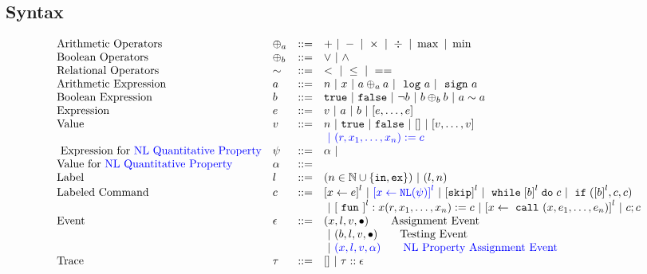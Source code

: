 %
%
\subsection{Syntax}
\[
\begin{array}{llll}
\mbox{Arithmetic Operators} 
& \oplus_a & ::= & + ~|~ - ~|~ \times 
%
~|~ \div ~|~ \max ~|~ \min\\  
\mbox{Boolean Operators} 
& \oplus_b & ::= & \lor ~|~ \land
\\
%
\mbox{Relational Operators} 
& \sim & ::= & < ~|~ \leq ~|~ == 
\\  
%
\mbox{Arithmetic Expression} 
& \aexpr & ::= & 
n ~|~ {x} ~|~ \aexpr \oplus_a \aexpr  
 ~|~ \elog \aexpr  ~|~ \esign \aexpr
\\
%
\mbox{Boolean Expression} & \bexpr & ::= & 
%
\etrue ~|~ \efalse  ~|~ \neg \bexpr
 ~|~ \bexpr \oplus_b \bexpr
%
~|~ \aexpr \sim \aexpr 
\\
%
\mbox{Expression} & \expr & ::= & v ~|~ \aexpr ~|~ \bexpr ~|~ [\expr, \dots, \expr]
\\  
%
\mbox{Value} 
& v & ::= & { n ~|~ \etrue ~|~ \efalse ~|~ [] ~|~ [v, \dots, v]}  
\\ 
&&&
\highlight
{
~|~ (r, x_1, \ldots, x_n) := c
}
\\
%
\mbox{ Expression for \highlight{NL Quantitative Property}} 
& {\qexpr} & ::= 
& 
{ \qval ~|~ 
} 
\\
%
\mbox{Value for \highlight{NL Quantitative Property}} & \qval & ::= 
& 
\\
\mbox{Label} 
& l & ::= & (n \in \mathbb{N} \cup \{\lin, \lex\}) ~|~ (l, n)
\\ 
%
\mbox{Labeled Command} 
& {c} & ::= &  
\clabel{\assign{x}{\expr}}^l 
~|~ \highlight{\clabel{\assign{x}{\nonlinear(\qexpr)}}^l}
~|~  \clabel{\eskip}^l
~|~ \ewhile \clabel{\bexpr}^{l} \edo {c}
~|~ \eif(\clabel{\bexpr}^{l} , {c}, {c}) 
\\ 
&&&
~|~ \clabel{\efun}^l: x(r, x_1, \ldots, x_n) := c
~|~ \clabel{\assign{x}{\ecall(x, e_1, \ldots, e_n)}}^l
~|~ {c};{c}  
\\ 
\mbox{Event} 
& \event & ::= & 
({x}, l, v, \bullet)   \qquad \mbox{Assignment Event} \\
&&& ~|~(\bexpr, l, v, \bullet)  \qquad \mbox{Testing Event}
\\
&&& ~|~ \highlight{({x}, l, v, \qval)  \qquad \mbox{NL Property Assignment Event}}
\\
\mbox{Trace} & \trace
& ::= & [] ~|~ \trace :: \event\\
\end{array}
\]
